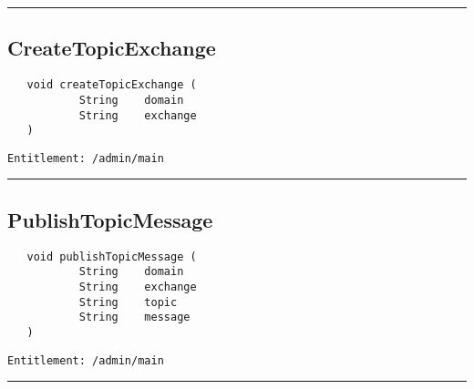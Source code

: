 \rule{12cm}{2pt}
\subsection{CreateTopicExchange}
\label{Api:CreateTopicExchange}
\begin{Verbatim}
   void createTopicExchange (
           String    domain
           String    exchange
   )
\end{Verbatim}
\begin{Verbatim}[formatcom=\color{Maroon}]
  Entitlement: /admin/main
\end{Verbatim}



\rule{12cm}{2pt}
\subsection{PublishTopicMessage}
\label{Api:PublishTopicMessage}
\begin{Verbatim}
   void publishTopicMessage (
           String    domain
           String    exchange
           String    topic
           String    message
   )
\end{Verbatim}
\begin{Verbatim}[formatcom=\color{Maroon}]
  Entitlement: /admin/main
\end{Verbatim}



\rule{12cm}{2pt}
